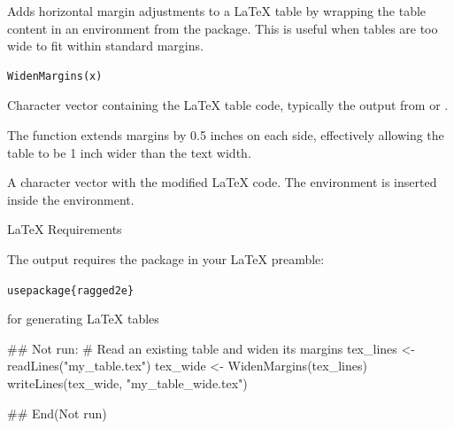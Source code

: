 \documentclass[a4paper]{book}
\begin{document}
%
\begin{Description}
Adds horizontal margin adjustments to a LaTeX table by wrapping the table
content in an  environment from the  package.
This is useful when tables are too wide to fit within standard margins.
\end{Description}
%
\begin{Usage}
\begin{verbatim}
WidenMargins(x)
\end{verbatim}
\end{Usage}
%
\begin{Arguments}
\begin{ldescription}
\item[\code{x}] Character vector containing the LaTeX table code, typically the
output from  or .
\end{ldescription}
\end{Arguments}
%
\begin{Details}
The function extends margins by 0.5 inches on each side, effectively allowing
the table to be 1 inch wider than the text width.
\end{Details}
%
\begin{Value}
A character vector with the modified LaTeX code. The 
environment is inserted inside the  environment.
\end{Value}
%
\begin{Section}{LaTeX Requirements}

The output requires the  package in your LaTeX preamble:
\begin{alltt}\bsl{}usepackage\{ragged2e\}\end{alltt}

\end{Section}
%
\begin{SeeAlso}
 for generating LaTeX tables
\end{SeeAlso}
%
\begin{Examples}
\begin{ExampleCode}
## Not run: 
# Read an existing table and widen its margins
tex_lines <- readLines("my_table.tex")
tex_wide <- WidenMargins(tex_lines)
writeLines(tex_wide, "my_table_wide.tex")

## End(Not run)

\end{ExampleCode}
\end{Examples}
\printindex{}
\end{document}
